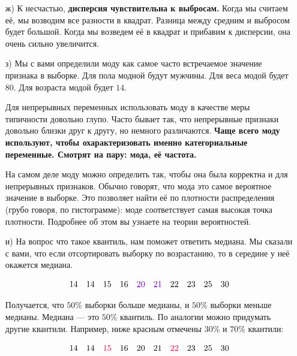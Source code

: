 \documentclass[12pt, a4paper, oneside]{article}
\theoremstyle{plain} %
\theoremstyle{definition}
\newcommand{\indef}[1]{\textbf{ \color{green} #1}}
\begin{document}
\begin{solution}
\begin{enumerate}
\begin{center}
\end{center}	

	\item[ж)]  К несчастью, \indef{дисперсия чувствительна к выбросам.} Когда мы считаем её, мы возводим все разности в квадрат. Разница между средним и выбросом будет большой. Когда мы возведем её в квадрат и прибавим к дисперсии, она очень сильно увеличится. 
	
	\item[з)] Мы с вами определили моду как самое часто встречаемое значение признака в выборке. Для пола модной будут мужчины. Для веса модой будет $80$. Для возраста модой будет $14$.  
	
	Для непрерывных переменных использовать моду в качестве меры типичности довольно глупо. Часто бывает так, что непрерывные признаки довольно близки друг к другу, но немного различаются. \indef{Чаще всего моду используют, чтобы охарактеризовать именно категориальные переменные. Смотрят на пару: мода, её частота.} 
	
	На самом деле моду можно определить так, чтобы она была корректна и для непрерывных признаков. Обычно говорят, что мода это самое вероятное значение в выборке.  Это позволяет найти её по плотности распределения (грубо говоря, по гистограмме): моде соответствует самая высокая точка плотности. Подробнее об этом вы узнаете на теории вероятностей. 
	
	\item[и)]  На вопрос что такое квантиль, нам поможет ответить медиана. Мы сказали с вами, что если отсортировать выборку по возрастанию, то в середине у неё окажется медиана. 
	
	\[
	14 \quad 14  \quad 15  \quad 16  \quad {\color{purp} 20}  \quad {\color{purp} 21}  \quad 22  \quad 23  \quad 25  \quad 30
	\]
	
	Получается, что $50\%$ выборки больше медианы, и $50\%$ выборки меньше медианы. Медиана --- это $50\%$ квантиль. По аналогии можно придумать другие квантили. Например, ниже красным отмечены $30\%$ и $70\%$ квантили: 
	
	\[
	14 \quad 14  \quad {\color{red} 15}  \quad 16  \quad 20  \quad 21  \quad {\color{red} 22}  \quad 23  \quad 25  \quad 30
	\]
	

\end{enumerate}
\end{solution}
\end{document}
